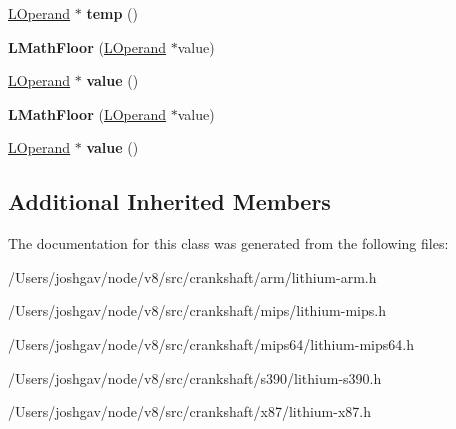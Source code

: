 \begin{DoxyCompactItemize}
\item 
\hyperlink{classv8_1_1internal_1_1_l_operand}{L\+Operand} $\ast$ {\bfseries temp} ()\hypertarget{classv8_1_1internal_1_1_l_math_floor_a6dba5b685df18250fb2c8f99d62ead4d}{}\label{classv8_1_1internal_1_1_l_math_floor_a6dba5b685df18250fb2c8f99d62ead4d}

\item 
{\bfseries L\+Math\+Floor} (\hyperlink{classv8_1_1internal_1_1_l_operand}{L\+Operand} $\ast$value)\hypertarget{classv8_1_1internal_1_1_l_math_floor_a2d17bb06f9e1be7ed65a2ba93218559e}{}\label{classv8_1_1internal_1_1_l_math_floor_a2d17bb06f9e1be7ed65a2ba93218559e}

\item 
\hyperlink{classv8_1_1internal_1_1_l_operand}{L\+Operand} $\ast$ {\bfseries value} ()\hypertarget{classv8_1_1internal_1_1_l_math_floor_a1506827f0839b96f8ff12a9d411d3485}{}\label{classv8_1_1internal_1_1_l_math_floor_a1506827f0839b96f8ff12a9d411d3485}

\item 
{\bfseries L\+Math\+Floor} (\hyperlink{classv8_1_1internal_1_1_l_operand}{L\+Operand} $\ast$value)\hypertarget{classv8_1_1internal_1_1_l_math_floor_a2d17bb06f9e1be7ed65a2ba93218559e}{}\label{classv8_1_1internal_1_1_l_math_floor_a2d17bb06f9e1be7ed65a2ba93218559e}

\item 
\hyperlink{classv8_1_1internal_1_1_l_operand}{L\+Operand} $\ast$ {\bfseries value} ()\hypertarget{classv8_1_1internal_1_1_l_math_floor_a1506827f0839b96f8ff12a9d411d3485}{}\label{classv8_1_1internal_1_1_l_math_floor_a1506827f0839b96f8ff12a9d411d3485}

\end{DoxyCompactItemize}
\subsection*{Additional Inherited Members}


The documentation for this class was generated from the following files\+:\begin{DoxyCompactItemize}
\item 
/\+Users/joshgav/node/v8/src/crankshaft/arm/lithium-\/arm.\+h\item 
/\+Users/joshgav/node/v8/src/crankshaft/mips/lithium-\/mips.\+h\item 
/\+Users/joshgav/node/v8/src/crankshaft/mips64/lithium-\/mips64.\+h\item 
/\+Users/joshgav/node/v8/src/crankshaft/s390/lithium-\/s390.\+h\item 
/\+Users/joshgav/node/v8/src/crankshaft/x87/lithium-\/x87.\+h\end{DoxyCompactItemize}
